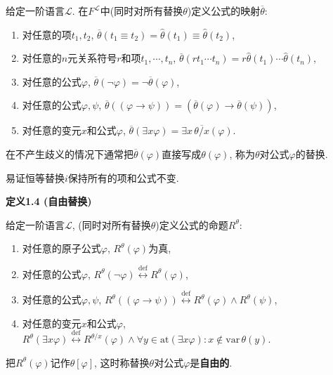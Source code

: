 \documentclass[UTF8]{ctexart}
\begin{document}
给定一阶语言$\mathcal{L}$.
在$F^{\mathcal{L}}$中(同时对所有替换$\theta$)定义公式的映射$\overline{\theta}$:
\begin{enumerate}
    \item 对任意的项$t_1,t_2$,
    $\overline{\theta}(t_1\equiv t_2)=\widehat{\theta}(t_1)\equiv
    \widehat{\theta}(t_2)$,
    \item 对任意的$n$元关系符号$r$和项$t_1,\cdots,t_n$,
    $\overline{\theta}(rt_1\cdots t_n)=r \widehat{\theta}(t_1)\cdots
    \widehat{\theta}(t_n)$,
    \item 对任意的公式$\varphi$,
    $\overline{\theta}(\neg\varphi)=\neg \overline{\theta}(\varphi)$,
    \item 对任意的公式$\varphi,\psi$, $\overline{\theta}((\varphi\to\psi))
    =(\overline{\theta}(\varphi)\to \overline{\theta}(\psi))$,
    \item 对任意的变元$x$和公式$\varphi$,
    $\overline{\theta}(\exists x\varphi)=\exists x\,\overline{\theta/x}(\varphi)$.
\end{enumerate}
在不产生歧义的情况下通常把$\overline{\theta}(\varphi)$直接写成$\theta(\varphi)$,
称为$\theta$对公式$\varphi$的替换.

\vspace{10pt}

易证恒等替换$i$保持所有的项和公式不变.

\vspace{10pt}

\hypertarget{sec:定义1.4}{}
\noindent\textbf{定义1.4 (自由替换)}

给定一阶语言$\mathcal{L}$, (同时对所有替换$\theta$)定义公式的命题$R^\theta$:
\begin{enumerate}
    \item 对任意的原子公式$\varphi$, $R^\theta(\varphi)$为真,
    \vspace{3pt}
    \item 对任意的公式$\varphi$,
    $R^\theta(\neg\varphi)\overset{\mathrm{def}}{\leftrightarrow}R^\theta(\varphi)$,
    \vspace{3pt}
    \item 对任意的公式$\varphi,\psi$,
    $R^\theta((\varphi\to\psi))\overset{\mathrm{def}}{\leftrightarrow}
    R^\theta(\varphi)\land R^\theta(\psi)$,
    \vspace{3pt}
    \item 对任意的变元$x$和公式$\varphi$,
    $R^\theta(\exists x\varphi)\overset{\mathrm{def}}{\leftrightarrow}
    R^{\theta/x}(\varphi)
    \land\forall y\in\mathrm{at}(\exists x\varphi):x\notin\mathrm{var}\,\theta(y)$.
\end{enumerate}
把$R^\theta(\varphi)$记作$\theta[\varphi]$,
这时称替换$\theta$对公式$\varphi$是\textbf{自由的}.
\end{document}
